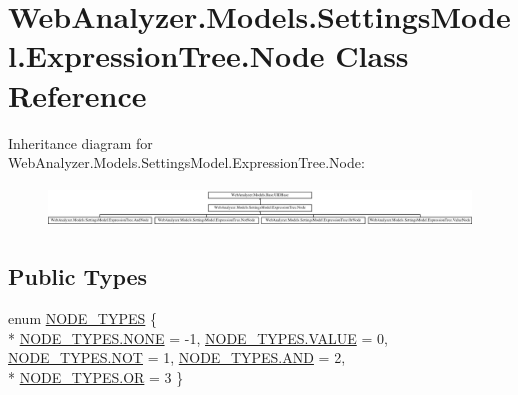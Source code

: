 \hypertarget{class_web_analyzer_1_1_models_1_1_settings_model_1_1_expression_tree_1_1_node}{}\section{Web\+Analyzer.\+Models.\+Settings\+Model.\+Expression\+Tree.\+Node Class Reference}
\label{class_web_analyzer_1_1_models_1_1_settings_model_1_1_expression_tree_1_1_node}
Inheritance diagram for Web\+Analyzer.\+Models.\+Settings\+Model.\+Expression\+Tree.\+Node\+:\begin{figure}[H]
\begin{center}
\leavevmode
\includegraphics[height=1.096606cm]{class_web_analyzer_1_1_models_1_1_settings_model_1_1_expression_tree_1_1_node}
\end{center}
\end{figure}
\subsection*{Public Types}
\begin{DoxyCompactItemize}
\item 
enum \hyperlink{class_web_analyzer_1_1_models_1_1_settings_model_1_1_expression_tree_1_1_node_a89c72b19ff778cbc04788f4cb47a730e}{N\+O\+D\+E\+\_\+\+T\+Y\+P\+E\+S} \{ \\*
\hyperlink{class_web_analyzer_1_1_models_1_1_settings_model_1_1_expression_tree_1_1_node_a89c72b19ff778cbc04788f4cb47a730eab50339a10e1de285ac99d4c3990b8693}{N\+O\+D\+E\+\_\+\+T\+Y\+P\+E\+S.\+N\+O\+N\+E} = -\/1, 
\hyperlink{class_web_analyzer_1_1_models_1_1_settings_model_1_1_expression_tree_1_1_node_a89c72b19ff778cbc04788f4cb47a730eaecc2e9c313faddb07e7da223c1dc5c3f}{N\+O\+D\+E\+\_\+\+T\+Y\+P\+E\+S.\+V\+A\+L\+U\+E} = 0, 
\hyperlink{class_web_analyzer_1_1_models_1_1_settings_model_1_1_expression_tree_1_1_node_a89c72b19ff778cbc04788f4cb47a730ea10df3d67626099df882920ba6552f16d}{N\+O\+D\+E\+\_\+\+T\+Y\+P\+E\+S.\+N\+O\+T} = 1, 
\hyperlink{class_web_analyzer_1_1_models_1_1_settings_model_1_1_expression_tree_1_1_node_a89c72b19ff778cbc04788f4cb47a730ea558ffc8f5770d8e4f95f51d822685532}{N\+O\+D\+E\+\_\+\+T\+Y\+P\+E\+S.\+A\+N\+D} = 2, 
\\*
\hyperlink{class_web_analyzer_1_1_models_1_1_settings_model_1_1_expression_tree_1_1_node_a89c72b19ff778cbc04788f4cb47a730ea1d00e7dce692e8dc3f6877f035e3a616}{N\+O\+D\+E\+\_\+\+T\+Y\+P\+E\+S.\+O\+R} = 3
 \}
\end{DoxyCompactItemize}
